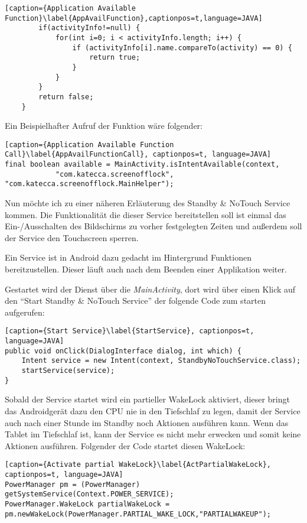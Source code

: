 \begin{flushleft}
\begin{lstlisting}[caption={Application Available Function}\label{AppAvailFunction},captionpos=t,language=JAVA]
		if(activityInfo!=null) {
            for(int i=0; i < activityInfo.length; i++) {
            	if (activityInfo[i].name.compareTo(activity) == 0) {
            		return true;
            	}
            }
        }
		return false;
	}
\end{lstlisting}

Ein Beispielhafter Aufruf der Funktion wäre folgender:

\begin{lstlisting}[caption={Application Available Function Call}\label{AppAvailFunctionCall}, captionpos=t, language=JAVA] 
final boolean available = MainActivity.isIntentAvailable(context,
			"com.katecca.screenofflock", "com.katecca.screenofflock.MainHelper");
\end{lstlisting}

Nun möchte ich zu einer näheren Erläuterung des Standby \& NoTouch Service kommen. Die Funktionalität die dieser Service bereitstellen soll ist einmal das Ein-/Ausschalten des Bildschirms zu vorher festgelegten Zeiten und außerdem soll der Service den Touchscreen sperren.

Ein Service ist in Android dazu gedacht im Hintergrund Funktionen bereitzustellen. Dieser läuft auch nach dem Beenden einer Applikation weiter.

Gestartet wird der Dienst über die \textit{MainActivity}, dort wird über einen Klick auf den ``Start Standby \& NoTouch Service'' der folgende Code zum starten aufgerufen:
\newpage
\begin{lstlisting}[caption={Start Service}\label{StartService}, captionpos=t, language=JAVA] 
public void onClick(DialogInterface dialog, int which) {
	Intent service = new Intent(context, StandbyNoTouchService.class);
	startService(service);
}
\end{lstlisting}

Sobald der Service startet wird ein partieller WakeLock aktiviert, dieser bringt das Androidgerät dazu den CPU nie in den Tiefschlaf zu legen, damit der Service auch nach einer Stunde im Standby noch Aktionen ausführen kann. Wenn das Tablet im Tiefschlaf ist, kann der Service es nicht mehr erwecken und somit keine Aktionen ausführen. Folgender der Code startet diesen WakeLock:

\begin{lstlisting}[caption={Activate partial WakeLock}\label{ActPartialWakeLock}, captionpos=t, language=JAVA]
PowerManager pm = (PowerManager) getSystemService(Context.POWER_SERVICE);
PowerManager.WakeLock partialWakeLock = pm.newWakeLock(PowerManager.PARTIAL_WAKE_LOCK,"PARTIALWAKEUP");


\end{lstlisting}
\end{flushleft}
